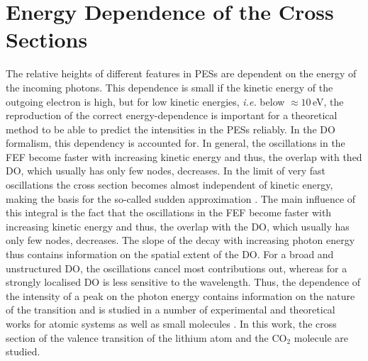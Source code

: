 \section{Energy Dependence of the Cross Sections}
\label{sec:cs}
The relative heights of different features in PESs are dependent on the energy of the incoming photons.
This dependence is small if the kinetic energy of the outgoing electron is high, but for low kinetic energies, \textit{i.e.} below $\approx 10\,$eV, the reproduction of the correct energy-dependence is important for a theoretical method to be able to predict the intensities in the PESs reliably.
In the DO formalism, this dependency is accounted for.
In general, the oscillations in the FEF become faster with increasing kinetic energy and thus, the overlap with thed DO, which usually has only few nodes, decreases.
In the limit of very fast oscillations the cross section becomes almost independent of kinetic energy, making the basis for the so-called sudden approximation \cite{saAberg}.
The main influence of this integral is the fact that the oscillations in the FEF become faster with increasing kinetic energy and thus, the overlap with the DO, which usually has only few nodes, decreases.
The slope of the decay with increasing photon energy thus contains information on the spatial extent of the DO.
For a broad and unstructured DO, the oscillations cancel most contributions out, whereas for a strongly localised DO is less sensitive to the wavelength.
Thus, the dependence of the intensity of a peak on the photon energy contains information on the nature of the transition and is studied in a number of experimental and theoretical works for atomic systems as well as small molecules \cite{do_modCoul,LiNaRef1,LiCS,stieltje}.
In this work, the cross section of the valence transition of the lithium atom and the CO$_2$ molecule are studied.

